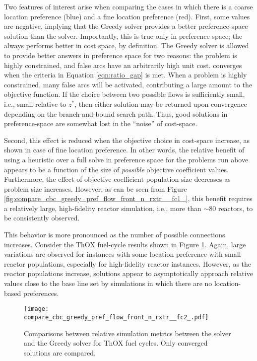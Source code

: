 Two features of interest arise when comparing the cases in which there is a
coarse location preference (blue) and a fine location preference (red). First,
some values are negative, implying that the Greedy solver provides a better
preference-space solution than the \cbc solver. Importantly, this is true only
in preference space; the \cbc always performs better in cost space, by
definition. The Greedy solver is allowed to provide better answers in preference
space for two reasons: the problem is highly constrained, and false arcs have an
arbitrarily high unit cost. \cbc converges when the criteria in Equation
\ref{eqn:ratio_gap} is met. When a problem is highly constrained, many false
arcs will be activated, contributing a large amount to the objective
function. If the choice between two possible flows is sufficiently small, i.e.,
small relative to $z^*$, then either solution may be returned upon convergence
depending on the branch-and-bound search path. Thus, good solutions in
preference-space are somewhat lost in the ``noise'' of cost-space.

Second, this effect is reduced when the objective choice in cost-space increase,
as shown in case of fine location preference. In other words, the relative
benefit of using a heuristic over a full \cbc solve in preference space for the
problems run above appears to be a function of the size of \textit{possible}
objective coefficient values. Furthermore, the effect of objective coefficient
population size decreases as problem size increases. However, as can be seen
from Figure \ref{fig:compare_cbc_greedy_pref_flow_front_n_rxtr__fc1_}, this
benefit requires a relatively large, high-fidelity reactor simulation, i.e., more
than $\sim$80 reactors, to be consistently observed. 

This behavior is more pronounced as the number of possible connections
increases. Consider the ThOX fuel-cycle results shown in Figure
\ref{fig:compare_cbc_greedy_pref_flow_front_n_rxtr__fc2_}. Again, large
variations are observed for instances with some location preference with small
reactor populations, especially for high-fidelity reactor instances. However, as
the reactor populations increase, \cbc solutions appear to asymptotically
approach relative values close to the base line set by simulations in which
there are no location-based preferences.

\begin{figure}[h!]
  \begin{center}
    \texttt{[image: compare\_cbc\_greedy\_pref\_flow\_front\_n\_rxtr\_\_fc2\_.pdf]}
    \caption{
      \label{fig:compare_cbc_greedy_pref_flow_front_n_rxtr__fc2_}
      Comparisons between relative simulation metrics between the \cbc solver and
      the Greedy solver for ThOX fuel cycles. Only converged \cbc
      solutions are compared.  }
  \end{center}
\end{figure}

